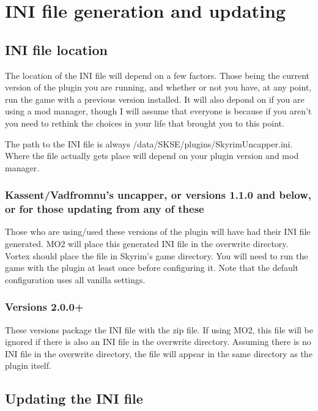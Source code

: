 \documentclass[12pt]{amsart}
\begin{document}
\startblock
\section{INI file generation and updating}

\subsection{INI file location}

The location of the INI file will depend on a few factors. Those being the
current version of the plugin you are running, and whether or not you have,
at any point, run the game with a previous version installed. It will also
depond on if you are using a mod manager, though I will assume that everyone
is because if you aren't you need to rethink the choices in your life that
brought you to this point.

The path to the INI file is always /data/SKSE/plugins/SkyrimUncapper.ini.
Where the file actually gets place will depend on your plugin version and
mod manager.
\stopblock

\startblock
\subsubsection{Kassent/Vadfromnu's uncapper, or versions 1.1.0 and below,
or for those updating from any of these}

Those who are using/used these versions of the plugin will have had their
INI file generated. MO2 will place this generated INI file in the overwrite
directory. Vortex should place the file in Skyrim's game directory. You will
need to run the game with the plugin at least once before configuring it.
Note that the default configuration uses all vanilla settings.
\stopblock

\startblock
\subsubsection{Versions 2.0.0+}

These versions package the INI file with the zip file. If using MO2, this file
will be ignored if there is also an INI file in the overwrite directory.
Assuming there is no INI file in the overwrite directory, the file will appear
in the same directory as the plugin itself.
\stopblock

\startblock
\subsection{Updating the INI file}
\end{document}
